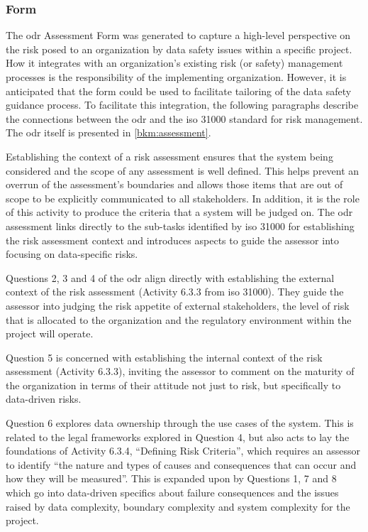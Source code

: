 \subsubsection{ Form}
The \gls{odr} Assessment Form was generated to capture a high-level perspective on the risk posed to an organization by data safety issues within a specific project. How it integrates with an organization's existing risk (or safety) management processes is the responsibility of the implementing organization.
However, it is anticipated that the form could be used to facilitate tailoring of the data safety guidance process.
To facilitate this integration, the following paragraphs describe the connections between the \gls{odr} and the
\acrshort{iso} 31000 \cite{citation:iso310002018risk}
standard for risk management.
The \gls{odr} itself is presented in \autoref{bkm:assessment}.

Establishing the context of a risk assessment ensures that the system being considered and the scope of any assessment is well defined. This helps prevent an overrun of the assessment's boundaries and allows those items that are out of scope to be explicitly communicated to all \glspl{stakeholder}. In addition, it is the role of this activity to produce the criteria that a system will be judged on. The \gls{odr} assessment links directly to the sub-tasks identified by \acrshort{iso} 31000 for establishing the risk assessment context and introduces aspects to guide the assessor into focusing on data-specific risks.

Questions 2, 3 and 4 of the \gls{odr} align directly with establishing the external context of the risk assessment
(Activity 6.3.3 from \acrshort{iso} 31000).
They guide the assessor into judging the risk appetite of external \glspl{stakeholder}, the level of risk that is allocated to the organization and the regulatory environment within the project will operate.

Question 5 is concerned with establishing the internal context of the risk assessment
(Activity 6.3.3),
inviting the assessor to comment on the maturity of the organization in terms of their attitude not just to risk, but specifically to data-driven risks.

Question 6 explores data ownership through the use cases of the system. This is related to the legal frameworks explored in Question 4, but also acts to lay the foundations of Activity
6.3.4,
``Defining Risk Criteria'', which requires an assessor to identify ``the nature and types of causes and consequences that can occur and how they will be measured''. This is expanded upon by Questions 1, 7 and 8 which go into data-driven specifics about failure consequences and the issues raised by data complexity, boundary complexity and system complexity for the project.

